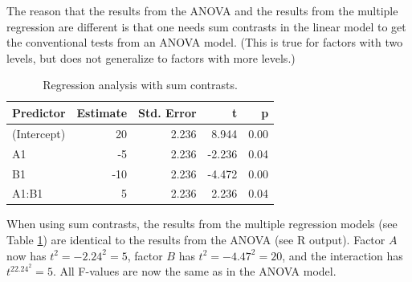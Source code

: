 \documentclass[12pt,]{krantz}
\newenvironment{Shaded}{\begin{snugshade}}{\end{snugshade}}
\newcommand{\CommentTok}[1]{\textcolor[rgb]{0.56,0.35,0.01}{\textit{#1}}}
\newcommand{\DataTypeTok}[1]{\textcolor[rgb]{0.13,0.29,0.53}{#1}}
\newcommand{\DecValTok}[1]{\textcolor[rgb]{0.00,0.00,0.81}{#1}}
\newcommand{\KeywordTok}[1]{\textcolor[rgb]{0.13,0.29,0.53}{\textbf{#1}}}
\newcommand{\NormalTok}[1]{#1}
\newcommand{\OperatorTok}[1]{\textcolor[rgb]{0.81,0.36,0.00}{\textbf{#1}}}
\newcommand{\StringTok}[1]{\textcolor[rgb]{0.31,0.60,0.02}{#1}}
\begin{document}
The reason that the results from the ANOVA and the results from the multiple regression are different is that one needs sum contrasts in the linear model to get the conventional tests from an ANOVA model. (This is true for factors with two levels, but does not generalize to factors with more levels.)

\begin{Shaded}
\end{Shaded}

\begin{table}[h]

\caption{\label{tab:table18}Regression analysis with sum contrasts.}
\centering
\begin{tabular}[t]{lrrrr}
\toprule
Predictor & Estimate & Std. Error & t & p\\
\midrule
(Intercept) & 20 & 2.236 & 8.944 & 0.00\\
A1 & -5 & 2.236 & -2.236 & 0.04\\
B1 & -10 & 2.236 & -4.472 & 0.00\\
A1:B1 & 5 & 2.236 & 2.236 & 0.04\\
\bottomrule
\end{tabular}
\end{table}

When using sum contrasts, the results from the multiple regression models (see Table \ref{tab:table18}) are identical to the results from the ANOVA (see R output). Factor \(A\) now has \(t^2=-2.24^2 = 5\), factor \(B\) has \(t^2=-4.47^2 = 20\), and the interaction has \(t^22.24^2 = 5\). All F-values are now the same as in the ANOVA model.
\end{document}
